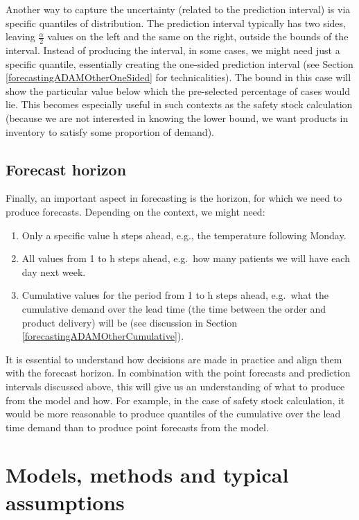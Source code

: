 \documentclass[]{book}
\providecommand{\tightlist}{%
  \setlength{\itemsep}{0pt}\setlength{\parskip}{0pt}}
\theoremstyle{definition}
\theoremstyle{definition}
\theoremstyle{definition}
\theoremstyle{definition}
\theoremstyle{remark}
\begin{document}
Another way to capture the uncertainty (related to the prediction interval) is via specific quantiles of distribution. The prediction interval typically has two sides, leaving \(\frac{\alpha}{2}\) values on the left and the same on the right, outside the bounds of the interval. Instead of producing the interval, in some cases, we might need just a specific quantile, essentially creating the one-sided prediction interval (see Section \ref{forecastingADAMOtherOneSided} for technicalities). The bound in this case will show the particular value below which the pre-selected percentage of cases would lie. This becomes especially useful in such contexts as the safety stock calculation (because we are not interested in knowing the lower bound, we want products in inventory to satisfy some proportion of demand).

\hypertarget{forecast-horizon}{%
\subsection{Forecast horizon}\label{forecast-horizon}}

Finally, an important aspect in forecasting is the horizon, for which we need to produce forecasts. Depending on the context, we might need:

\begin{enumerate}
\def\labelenumi{\arabic{enumi}.}
\tightlist
\item
  Only a specific value h steps ahead, e.g., the temperature following Monday.
\item
  All values from 1 to h steps ahead, e.g.~how many patients we will have each day next week.
\item
  Cumulative values for the period from 1 to h steps ahead, e.g.~what the cumulative demand over the lead time (the time between the order and product delivery) will be (see discussion in Section \ref{forecastingADAMOtherCumulative}).
\end{enumerate}

It is essential to understand how decisions are made in practice and align them with the forecast horizon. In combination with the point forecasts and prediction intervals discussed above, this will give us an understanding of what to produce from the model and how. For example, in the case of safety stock calculation, it would be more reasonable to produce quantiles of the cumulative over the lead time demand than to produce point forecasts from the model.

\hypertarget{modelsMethods}{%
\section{Models, methods and typical assumptions}\label{modelsMethods}}
\end{document}
